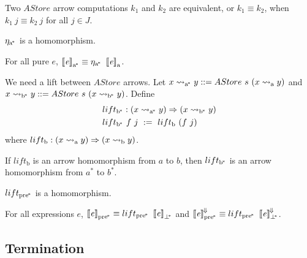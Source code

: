 \documentclass{llncs}
\newcommand{\arrow}{\rightsquigarrow}
\newcommand{\conv}{^{\mspace{-2mu}\Downarrow\mspace{-2mu}}}
\newcommand{\meaningofconv}[1]{\left\llbracket{#1}\right\rrbracket\conv}
\newcommand{\arrowlift}{\ensuremath{lift}}
\newcommand{\arrowtrans}{\ensuremath{\eta}}
\newcommand{\gen}{_\mathrm{a}}
\newcommand{\genb}{_\mathrm{b}}
\newcommand{\genc}{_\mathrm{a^{\mspace{-2mu}*}}}
\newcommand{\gend}{_\mathrm{b^{\mspace{-2mu}*}}}
\newcommand{\pbot}{{\bot^{\mspace{-4mu}*}}}
\newcommand{\ppre}{_\mathrm{pre^{\mspace{-2mu}*}}}
\newcommand{\liftppre}{\arrowlift\ppre}
\begin{document}
\begin{definition}
Two $AStore$ arrow computations $k_1$ and $k_2$ are equivalent, or $k_1 \equiv k_2$, when $k_1~j \equiv k_2~j$ for all $j \in J$.
\end{definition}

\begin{theorem}
$\arrowtrans\genc$ is a homomorphism.
\end{theorem}

\begin{corollary}
\label{cor:pure-astore-semantic-correctness}
For all pure $\mathit{e}$, $\meaningof{\mathit{e}}\genc \equiv \arrowtrans\genc~\meaningof{\mathit{e}}\gen$.
\end{corollary}

We need a lift between $AStore$ arrows.
Let $x \arrow\genc y ::= AStore~s~(x \arrow\gen y)$ and $x \arrow\gend y ::= AStore~s~(x \arrow\gend y)$.
Define
\begin{equation}
\begin{aligned}
	&\arrowlift\gend : (x \arrow\genc y) \tto (x \arrow\gend y) \\
	&\arrowlift\gend~f~j \ := \ \arrowlift\genb~(f~j)
\end{aligned}
\end{equation}
where $\arrowlift\genb : (x \arrow\gen y) \tto (x \arrow\genb y)$.

\begin{theorem}
If $\arrowlift\genb$ is an arrow homomorphism from $a$ to $b$, then $\arrowlift\gend$ is an arrow homomorphism from $a^*$ to $b^*$.
\end{theorem}

\begin{corollary}
$\liftppre$ is a homomorphism.
\end{corollary}

\begin{corollary}
For all expressions $\mathit{e}$, $\meaningof{\mathit{e}}\ppre \equiv \liftppre~\meaningof{\mathit{e}}_\pbot$ and $\meaningofconv{\mathit{e}}\ppre \equiv \liftppre~\meaningofconv{\mathit{e}}_\pbot$.
\end{corollary}

\subsection{Termination}
\end{document}

